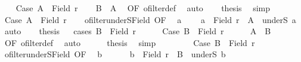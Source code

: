 \begin{isabellebody}
\ \ \isamarkupfalse%
\ Case{}{\isacharcolon}{\kern0pt}\ {\isachardoublequoteopen}A\ {\isacharequal}{\kern0pt}\ Field\ r{\isachardoublequoteclose}\isanewline
\ \ \isamarkupfalse%
\ {\isachardoublequoteopen}B\ {\isasymle}\ A{\isachardoublequoteclose}\ \isamarkupfalse%
\ OF{}\ ofilter{\isacharunderscore}{\kern0pt}def\ \isamarkupfalse%
\ auto\isanewline
\ \ \isamarkupfalse%
\ {\isacharquery}{\kern0pt}thesis\ \isamarkupfalse%
\ simp\isanewline
{}\isamarkupfalse%
\isanewline
\ \ \isamarkupfalse%
\ Case{}{\isacharcolon}{\kern0pt}\ {\isachardoublequoteopen}A\ {\isasymnoteq}\ Field\ r{\isachardoublequoteclose}\isanewline
\ \ \isamarkupfalse%
\ ofilter{\isacharunderscore}{\kern0pt}underS{\isacharunderscore}{\kern0pt}Field\ OF{}\ \isamarkupfalse%
\ a\ \isanewline
\ \ {}{\isacharcolon}{\kern0pt}\ {\isachardoublequoteopen}a\ {\isasymin}\ Field\ r\ {\isasymand}\ A\ {\isacharequal}{\kern0pt}\ underS\ a{\isachardoublequoteclose}\ \isamarkupfalse%
\ auto\isanewline
\ \ \isamarkupfalse%
\ {\isacharquery}{\kern0pt}thesis\isanewline
\ \ \isamarkupfalse%
{\isacharparenleft}{\kern0pt}cases\ {\isachardoublequoteopen}B\ {\isacharequal}{\kern0pt}\ Field\ r{\isachardoublequoteclose}{\isacharparenright}{\kern0pt}\isanewline
\ \ \ \ \isamarkupfalse%
\ Case{}{}{\isacharcolon}{\kern0pt}\ {\isachardoublequoteopen}B\ {\isacharequal}{\kern0pt}\ Field\ r{\isachardoublequoteclose}\isanewline
\ \ \ \ \isamarkupfalse%
\ {\isachardoublequoteopen}A\ {\isasymle}\ B{\isachardoublequoteclose}\ \isamarkupfalse%
\ OF{}\ ofilter{\isacharunderscore}{\kern0pt}def\ \isamarkupfalse%
\ auto\isanewline
\ \ \ \ \isamarkupfalse%
\ {\isacharquery}{\kern0pt}thesis\ \isamarkupfalse%
\ simp\isanewline
\ \ \isamarkupfalse%
\isanewline
\ \ \ \ \isamarkupfalse%
\ Case{}{}{\isacharcolon}{\kern0pt}\ {\isachardoublequoteopen}B\ {\isasymnoteq}\ Field\ r{\isachardoublequoteclose}\isanewline
\ \ \ \ \isamarkupfalse%
\ ofilter{\isacharunderscore}{\kern0pt}underS{\isacharunderscore}{\kern0pt}Field\ OF{}\ \isamarkupfalse%
\ b\ \isanewline
\ \ \ \ {}{\isacharcolon}{\kern0pt}\ {\isachardoublequoteopen}b\ {\isasymin}\ Field\ r\ {\isasymand}\ B\ {\isacharequal}{\kern0pt}\ underS\ b{\isachardoublequoteclose}\ \isamarkupfalse%

\end{isabellebody}
